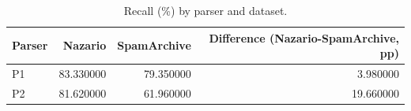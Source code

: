 \begin{table}[t]
\caption{Recall (\%) by parser and dataset.}
\label{tab:parser_dataset}
\begin{tabular}{lrrr}
\toprule
Parser & Nazario & SpamArchive & Difference (Nazario-SpamArchive, pp) \\
\midrule
P1 & 83.330000 & 79.350000 & 3.980000 \\
P2 & 81.620000 & 61.960000 & 19.660000 \\
\bottomrule
\end{tabular}
\end{table}
